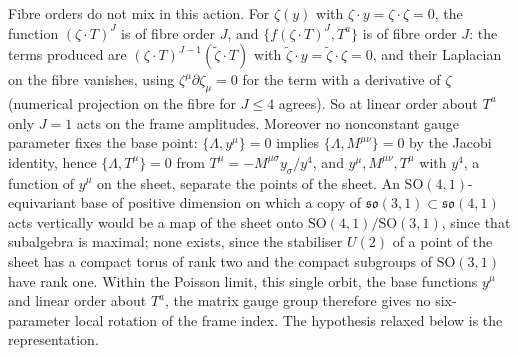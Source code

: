 Fibre orders do not mix in this action. For \(\zeta(y)\) with \(\zeta\cdot y=\zeta\cdot\zeta=0\), the function \((\zeta\cdot T)^J\) is of fibre order \(J\), and \(\{f(\zeta\cdot T)^J,T^a\}\) is of fibre order \(J\): the terms produced are \((\zeta\cdot T)^{J-1}(\tilde\zeta\cdot T)\) with \(\tilde\zeta\cdot y=\tilde\zeta\cdot\zeta=0\), and their Laplacian on the fibre vanishes, using \(\zeta^\mu\partial\zeta_\mu=0\) for the term with a derivative of \(\zeta\) (numerical projection on the fibre for \(J\le4\) agrees). So at linear order about \(T^a\) only \(J=1\) acts on the frame amplitudes. Moreover no nonconstant gauge parameter fixes the base point: \(\{\Lambda,y^\mu\}=0\) implies \(\{\Lambda,M^{\mu\nu}\}=0\) by the Jacobi identity, hence \(\{\Lambda,T^\mu\}=0\) from \(T^\mu=-M^{\mu\sigma}y_\sigma/y^4\), and \(y^\mu,M^{\mu\nu},T^\mu\) with \(y^4\), a function of \(y^\mu\) on the sheet, separate the points of the sheet. An \(\mathrm{SO}(4,1)\)-equivariant base of positive dimension on which a copy of \(\mathfrak{so}(3,1)\subset\mathfrak{so}(4,1)\) acts vertically would be a map of the sheet onto \(\mathrm{SO}(4,1)/\mathrm{SO}(3,1)\), since that subalgebra is maximal; none exists, since the stabiliser \(U(2)\) of a point of the sheet has a compact torus of rank two and the compact subgroups of \(\mathrm{SO}(3,1)\) have rank one. Within the Poisson limit, this single orbit, the base functions \(y^\mu\) and linear order about \(T^a\), the matrix gauge group therefore gives no six-parameter local rotation of the frame index. The hypothesis relaxed below is the representation.


